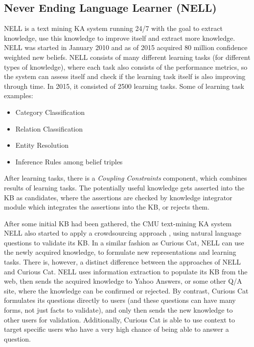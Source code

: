 \subsection{Never Ending Language Learner (NELL)}
\label{section:r:nell}
NELL\parencite{Mitchell2015} is a text mining KA system running 24/7 with the
goal to extract knowledge, use this knowledge to improve itself and extract
more knowledge. NELL was started in January 2010 and as of 2015 acquired
80 million confidence weighted new beliefs. NELL consists of many different
learning tasks (for different types of knowledge), where each task also consists of the performance metrics, so the system can assess itself and check if the 
learning task itself is also improving through time. In 2015, it consisted of
2500 learning tasks. Some of learning task examples:
\begin{itemize}
	\item Category Classification
	\item Relation Classification
	\item Entity Resolution
	\item Inference Rules among belief triples
\end{itemize}
After learning tasks, there is a \emph{Coupling Constraints} component, which
combines results of learning tasks. The potentially useful knowledge gets
asserted into the KB as candidates, where the assertions are checked by knowledge
integrator module which integrates the assertions into the KB, or rejects them.

After some initial KB had been gathered, the CMU text-mining KA system 
NELL also started to apply a crowdsourcing approach \parencite{Pedro2012a},
using natural language questions to validate its KB. In a similar
fashion as Curious Cat, NELL can use the newly acquired knowledge, to 
formulate new representations and learning tasks. There is, however, a 
distinct difference between the approaches of NELL and Curious Cat. 
NELL uses information extraction to populate its KB from the web, 
then sends the acquired knowledge to Yahoo Answers, or some other Q/A site, 
where the knowledge can be confirmed or rejected. 
By contrast, Curious Cat formulates its questions directly to users 
(and these questions can have many forms, not just facts to validate), 
and only then sends the new knowledge to other users for validation. 
Additionally, Curious Cat is able to use context to target specific users who 
have a very high chance of being able to answer a question.

